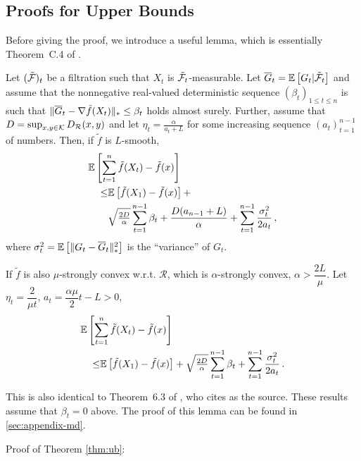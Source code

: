 \subsection{Proofs for Upper Bounds}
\label{sec:ub-proof}

Before giving the proof, we introduce a useful lemma, which is essentially Theorem~C.4 of \cite{MahdaviPhd:2014}.
\begin{lemma}
\label{lem:ub}
Let $({\tilde{\mathcal{F}}})_{t}$ be a filtration such that $X_t$ is ${\tilde{\mathcal{F}}}_t$-measurable.
Let $\overline G_t = \mathbb{E}\left[G_t|{\tilde{\mathcal{F}}}_t\right]$ 
and assume that the nonnegative real-valued deterministic sequence $(\beta_t)_{1\le t\le n}$ is such that 
$\|\overline G_t - \nabla \tilde{f}(X_t)\|_* \le \beta_t$ holds almost surely. 
Further, assume that $D=\sup_{x,y\in \mathcal{K}} D_{\mathcal{R}}(x,y)$ and let $\eta_t = \frac{\alpha}{a_t+L}$ for some increasing 
sequence $(a_t)_{t=1}^{n-1}$ of numbers. Then, if $\tilde{f}$ is $L$-smooth,
\begin{align*}
\MoveEqLeft \EE{ \sum_{t=1}^n \tilde{f}(X_t) - \tilde{f}(x) }  \\
\le& 	 \EE{\tilde{f}(X_1)-\tilde{f}(x)}+ \\
 & \sqrt{\tfrac{2D}{\alpha}} \sum_{t=1}^{n-1} \beta_t 
 +\frac{D(a_{n-1}+L)}{\alpha} +
	  \sum_{t=1}^{n-1}\frac{\sigma_t^2}{2a_t}\,,
\end{align*}
where $\sigma_t^2 = \mathbb{E}\left[ \|G_t-\overline G_t\|_*^2\right]$ is the ``variance'' of $G_t$.

If ${\tilde{f}}$ is also $\mu$-strongly convex w.r.t. $\mathcal{R}$, which is $\alpha$-strongly convex, $\alpha > \dfrac{2L}{\mu}$. Let $\eta_t = \dfrac{2}{\mu t}$, $a_t = \dfrac{\alpha \mu}{2}t-L > 0$,
\begin{align*}
\MoveEqLeft \EE{ \sum_{t=1}^n \tilde{f}(X_t) - \tilde{f}(x) }  \\
\le& 	 \EE{\tilde{f}(X_1)-\tilde{f}(x)}+ 
 \sqrt{\tfrac{2D}{\alpha}} \sum_{t=1}^{n-1} \beta_t 
 +\sum_{t=1}^{n-1}\frac{\sigma_t^2}{2a_t}\,.
\end{align*}
\end{lemma}
This is also identical to Theorem~6.3 of \cite{Bu:Convex14}, who cites \cite{Dekel:minibatch12} as the source. These results assume that $\beta_t=0$ above.
The proof of this lemma can be found in \cref{sec:appendix-md}.

Proof of Theorem \ref{thm:ub}:

